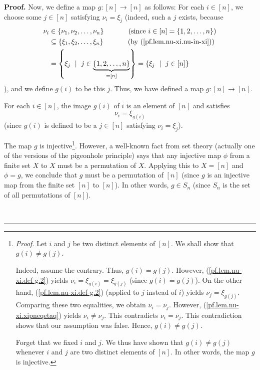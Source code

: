 \documentclass[numbers=enddot,12pt,final,onecolumn,notitlepage,english]{scrartcl}%
\theoremstyle{definition}
\newenvironment{proof}[1][Proof]{\noindent\textbf{#1.} }{\ \rule{0.5em}{0.5em}}
\newenvironment{verlong}{}{}
\begin{document}
\begin{verlong}
\begin{proof}
Now, we define a map $g:\left[  n\right]  \rightarrow\left[  n\right]  $ as
follows: For each $i\in\left[  n\right]  $, we choose some $j\in\left[
n\right]  $ satisfying $\nu_{i}=\xi_{j}$ (indeed, such a $j$ exists, because
\begin{align*}
\nu_{i}  &  \in\left\{  \nu_{1},\nu_{2},\ldots,\nu_{n}\right\}
\ \ \ \ \ \ \ \ \ \ \left(  \text{since }i\in\left[  n\right]  =\left\{
1,2,\ldots,n\right\}  \right) \\
&  \subseteq\left\{  \xi_{1},\xi_{2},\ldots,\xi_{n}\right\}
\ \ \ \ \ \ \ \ \ \ \left(  \text{by (\ref{pf.lem.nu-xi.nu-in-xi})}\right) \\
&  =\left\{  \xi_{j}\ \mid\ j\in\underbrace{\left\{  1,2,\ldots,n\right\}
}_{=\left[  n\right]  }\right\}  =\left\{  \xi_{j}\ \mid\ j\in\left[
n\right]  \right\}
\end{align*}
), and we define $g\left(  i\right)  $ to be this $j$. Thus, we have defined a
map $g:\left[  n\right]  \rightarrow\left[  n\right]  $.

For each $i\in\left[  n\right]  $, the image $g\left(  i\right)  $ of $i$ is
an element of $\left[  n\right]  $ and satisfies%
\begin{equation}
\nu_{i}=\xi_{g\left(  i\right)  } \label{pf.lem.nu-xi.def-g.2}%
\end{equation}
(since $g\left(  i\right)  $ is defined to be a $j\in\left[  n\right]  $
satisfying $\nu_{i}=\xi_{j}$).

The map $g$ is injective\footnote{\textit{Proof.} Let $i$ and $j$ be two
distinct elements of $\left[  n\right]  $. We shall show that $g\left(
i\right)  \neq g\left(  j\right)  $.
\par
Indeed, assume the contrary. Thus, $g\left(  i\right)  =g\left(  j\right)  $.
However, (\ref{pf.lem.nu-xi.def-g.2}) yields $\nu_{i}=\xi_{g\left(  i\right)
}=\xi_{g\left(  j\right)  }$ (since $g\left(  i\right)  =g\left(  j\right)
$). On the other hand, (\ref{pf.lem.nu-xi.def-g.2}) (applied to $j$ instead of
$i$) yields $\nu_{j}=\xi_{g\left(  j\right)  }$. Comparing these two
equalities, we obtain $\nu_{i}=\nu_{j}$. However,
(\ref{pf.lem.nu-xi.xipneqetaq}) yields $\nu_{i}\neq\nu_{j}$. This contradicts
$\nu_{i}=\nu_{j}$. This contradiction shows that our assumption was false.
Hence, $g\left(  i\right)  \neq g\left(  j\right)  $.
\par
Forget that we fixed $i$ and $j$. We thus have shown that $g\left(  i\right)
\neq g\left(  j\right)  $ whenever $i$ and $j$ are two distinct elements of
$\left[  n\right]  $. In other words, the map $g$ is injective.}. However, a
well-known fact from set theory (actually one of the versions of the
pigeonhole principle) says that any injective map $\phi$ from a finite set $X$
to $X$ must be a permutation of $X$. Applying this to $X=\left[  n\right]  $
and $\phi=g$, we conclude that $g$ must be a permutation of $\left[  n\right]
$ (since $g$ is an injective map from the finite set $\left[  n\right]  $ to
$\left[  n\right]  $). In other words, $g\in S_{n}$ (since $S_{n}$ is the set
of all permutations of $\left[  n\right]  $).


\end{proof}
\end{verlong}
\end{document}
